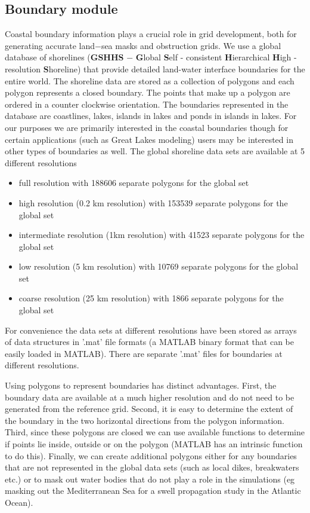 \documentclass[12pt]{article}
\begin{document}
\subsection{Boundary module}  
\label{sc:boundary}
Coastal boundary information plays a crucial role in grid development, both for generating accurate land$-$sea masks and obstruction grids. We use a global database of shorelines ({\bf GSHHS} $-$ {\bf G}lobal {\bf S}elf - consistent {\bf H}ierarchical {\bf H}igh - resolution {\bf S}horeline) that provide detailed land-water interface boundaries for the entire world. The shoreline data are stored as a collection of polygons and each polygon represents a closed boundary. The points that make up a polygon are ordered in a counter clockwise orientation. The boundaries represented in the database are coastlines, lakes, islands in lakes and ponds in islands in lakes. For our purposes we are primarily interested in the coastal boundaries though for certain applications (such as Great Lakes modeling) users may be interested in other types of boundaries as well. The global shoreline data sets are available at 5 different resolutions 
\begin{itemize}
\item full resolution with 188606 separate polygons for the global set
\item high resolution (0.2 km resolution) with 153539 separate polygons for the global set
\item intermediate resolution (1km resolution) with 41523 separate polygons for the global set
\item low resolution (5 km resolution) with 10769 separate polygons for the global set
\item coarse resolution (25 km resolution) with 1866 separate polygons for the global set 
\end{itemize} 
For convenience the data sets at different resolutions have been stored as arrays of data structures in '.mat' file formats (a MATLAB binary format that can be easily loaded in MATLAB). There are separate '.mat' files for boundaries at different resolutions. 

Using polygons to represent boundaries has distinct advantages.  First, the boundary data are available at a much higher resolution and do not need to be generated from the reference grid. Second, it is easy to determine the extent of the boundary in the two horizontal directions from the polygon information. Third, since these polygons are closed we can use available functions to determine if points lie inside, outside or on the polygon (MATLAB has an intrinsic function to do this). Finally, we can create additional polygons either for any boundaries that are not represented in the global data sets (such as local dikes, breakwaters etc.) or to mask out water bodies that do not play a role in the simulations (eg masking out the Mediterranean Sea for a swell propagation study in the Atlantic Ocean).
\end{document}
